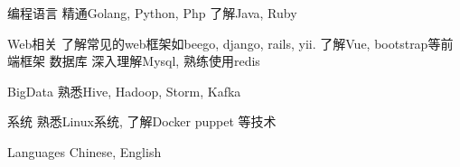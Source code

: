 

\begin{cvskills}

  \cvskill
    {编程语言} %
    {精通Golang, Python, Php 了解Java, Ruby} %

  \cvskill
    {Web相关} %
    {了解常见的web框架如beego, django, rails, yii. 了解Vue, bootstrap等前端框架} %
  \cvskill
    {数据库} %
    {深入理解Mysql, 熟练使用redis} %

  \cvskill
    {BigData} %
    {熟悉Hive, Hadoop, Storm, Kafka} %


  \cvskill
    {系统} %
    {熟悉Linux系统, 了解Docker puppet 等技术} %

    \cvskill
    {Languages} %
    {Chinese, English} %

\end{cvskills}
